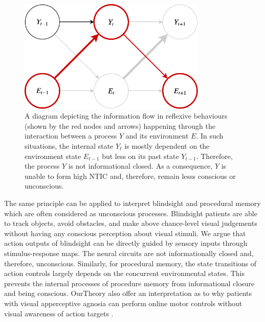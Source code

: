 \documentclass[utf8]{article}
\begin{document}
        		\begin{figure}[H]
        			\includegraphics[width=0.8\textwidth]{WritingMaterials/Fig_Reflexive/Reflexive.pdf}
        			\caption{
        			    A diagram depicting the information flow in reflexive behaviours (shown by the red nodes and arrows) happening through the interaction between a process $Y$ and its environment $E$. In such situations, the internal state $Y_t$ is mostly dependent on the environment state $E_{t-1}$ but less on its past state $Y_{t-1}$. Therefore, the process $Y$ is not informational closed. As a  consequence, $Y$ is unable to form high NTIC and, therefore, remain lesss conscious or unconscious. 
        			    }
        			\label{fig:reflexive}
        		\end{figure}  
        		
        		The same principle can be applied to interpret blindsight \citep{humphrey1999history, humphrey1974vision, Humphrey1970} and procedural memory \citep{doyon2009contributions, ashby2010cortical} which are often considered as unconscious processes. Blindsight patients are able to track objects, avoid obstacles, and make above chance-level visual judgements without having any conscious perception about visual stimuli. We argue that action outputs of blindsight can be directly guided by sensory inputs through stimulus-response maps. The neural circuits are not informationally closed and, therefore, unconscious. Similarly, for procedural memory, the state transitions of action controls largely depends on the concurrent environmental states. This prevents the internal processes of procedure memory from informational closure and being conscious. \ac{OurTheory} also offer an interpretation as to why patients with visual apperceptive agnosia \citep{james2003ventral} can perform online motor controls without visual awareness of action targets \citep{10.3389/fneur.2014.00255}. 
\end{document}
